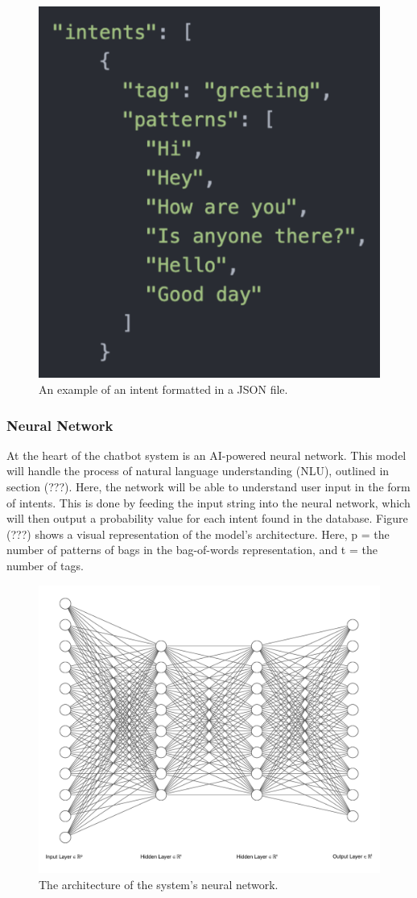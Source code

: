\documentclass[titlepage, 12pt]{article}
\begin{document}
\begin{figure}[h!]
    \centering\includegraphics[width=0.5\linewidth]{images/json.png}
    \caption{An example of an intent formatted in a JSON file.}
\end{figure}

\subsubsection{Neural Network}

At the heart of the chatbot system is an AI-powered neural network. This model will handle the process of natural language understanding (NLU), outlined in section (???). Here, the network will be able to understand user input in the form of intents. This is done by feeding the input string into the neural network, which will then output a probability value for each intent found in the database. Figure (???) shows a visual representation of the model’s architecture. Here, p = the number of patterns of bags in the bag-of-words representation, and t = the number of tags.

\begin{figure}[h!]
    \centering\includegraphics[width=0.875\linewidth]{images/nn-architecture.png}
    \caption{The architecture of the system's neural network.}
\end{figure}
\end{document}
